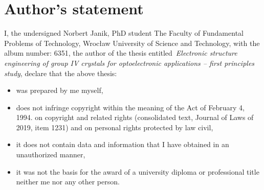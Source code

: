 \chapter*{Author's statement}

\setcounter{page}{1}

I, the undersigned Norbert Janik,
PhD student
The Faculty of Fundamental Problems of Technology, Wrocław University of Science and Technology,
with the album number: 6351,
the author of the thesis entitled~\textit{Electronic structure engineering of group IV crystals for optoelectronic applications -- first principles study}, \linebreak
declare that the above thesis:
\begin{itemize}
	\item was prepared by me myself,
	\item does not infringe copyright within the meaning of the Act of February 4, 1994.
	on copyright and related rights (consolidated text, Journal of Laws of 2019, item 1231) and on personal rights protected by law
	civil, 
	\item it does not contain data and information that I have obtained in an unauthorized manner, 
	\item it was not the basis for the award of a university diploma or professional title
	neither me nor any other person. 
\end{itemize}






\cleardoublepage